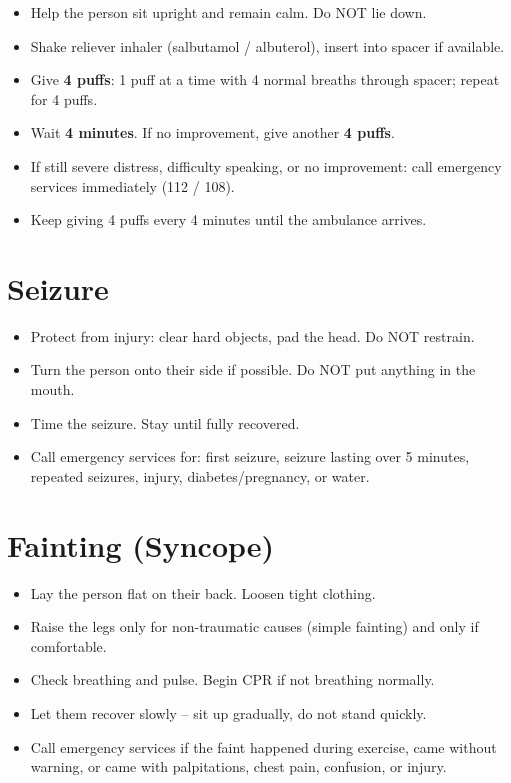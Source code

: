 \begin{itemize}[leftmargin=*]
\item Help the person sit upright and remain calm. Do NOT lie down.
\item Shake reliever inhaler (salbutamol / albuterol), insert into spacer if available.
\item Give \textbf{4 puffs}: 1 puff at a time with 4 normal breaths through spacer; repeat for 4 puffs.
\item Wait \textbf{4 minutes}. If no improvement, give another \textbf{4 puffs}.
\item If still severe distress, difficulty speaking, or no improvement: call emergency services immediately (112 / 108).
\item Keep giving 4 puffs every 4 minutes until the ambulance arrives.
\end{itemize}

\section{Seizure}

\begin{itemize}[leftmargin=*]
\item Protect from injury: clear hard objects, pad the head. Do NOT restrain.
\item Turn the person onto their side if possible. Do NOT put anything in the mouth.
\item Time the seizure. Stay until fully recovered.
\item Call emergency services for: first seizure, seizure lasting over 5 minutes, repeated seizures, injury, diabetes/pregnancy, or water.
\end{itemize}

\section{Fainting (Syncope)}

\begin{itemize}[leftmargin=*]
\item Lay the person flat on their back. Loosen tight clothing.
\item Raise the legs only for non-traumatic causes (simple fainting) and only if comfortable.
\item Check breathing and pulse. Begin CPR if not breathing normally.
\item Let them recover slowly -- sit up gradually, do not stand quickly.
\item Call emergency services if the faint happened during exercise, came without warning, or came with palpitations, chest pain, confusion, or injury.
\end{itemize}


